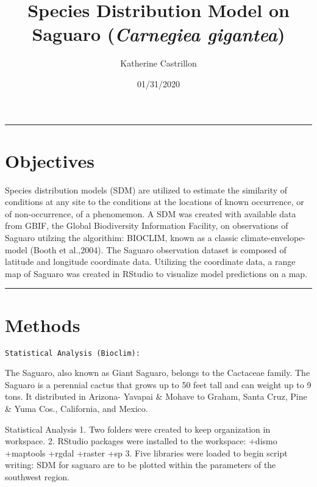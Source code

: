 \documentclass[
]{article}
\title{Species Distribution Model on Saguaro (\emph{Carnegiea gigantea})}
\author{Katherine Castrillon}
\date{01/31/2020}
\begin{document}
\maketitle

\begin{center}\rule{0.5\linewidth}{\linethickness}\end{center}

\hypertarget{objectives}{%
\section{Objectives}\label{objectives}}

Species distribution models (SDM) are utilized to estimate the
similarity of conditions at any site to the conditions at the locations
of known occurrence, or of non-occurrence, of a phenomemon. A SDM was
created with available data from GBIF, the Global Biodiversity
Information Facility, on observations of Saguaro utilzing the
algorithim: BIOCLIM, known as a classic climate-envelope-model (Booth et
al.,2004). The Saguaro observation dataset is composed of latitude and
longitude coordinate data. Utilizing the coordinate data, a range map of
Saguaro was created in RStudio to visualize model predictions on a map.

\begin{center}\rule{0.5\linewidth}{\linethickness}\end{center}

\hypertarget{methods}{%
\section{Methods}\label{methods}}

\begin{verbatim}
Statistical Analysis (Bioclim): 
\end{verbatim}

The Saguaro, also known as Giant Saguaro, belongs to the Cactaceae
family. The Saguaro is a perennial cactus that grows up to 50 feet tall
and can weight up to 9 tons. It distributed in Arizona- Yavapai \&
Mohave to Graham, Santa Cruz, Pine \& Yuma Cos., California, and Mexico.

Statistical Analysis 1. Two folders were created to keep organization in
workspace. 2. RStudio packages were installed to the workspace: +dismo
+maptools +rgdal +raster +sp 3. Five libraries were loaded to begin
script writing: SDM for saguaro are to be plotted within the parameters
of the southwest region.
\end{document}
